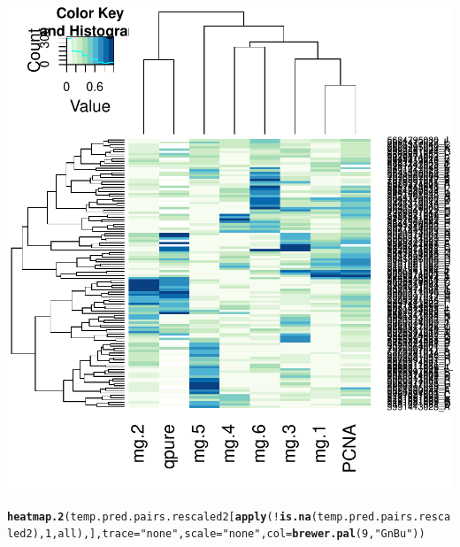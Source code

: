 \documentclass{article}\usepackage[]{graphicx}\usepackage[]{color}
\makeatletter
\def\maxwidth{ %
  \ifdim\Gin@nat@width>\linewidth
    \linewidth
  \else
    \Gin@nat@width
  \fi
}
\newcommand{\hlnum}[1]{\textcolor[rgb]{0.686,0.059,0.569}{#1}}%
\newcommand{\hlstr}[1]{\textcolor[rgb]{0.192,0.494,0.8}{#1}}%
\newcommand{\hlopt}[1]{\textcolor[rgb]{0,0,0}{#1}}%
\newcommand{\hlstd}[1]{\textcolor[rgb]{0.345,0.345,0.345}{#1}}%
\newcommand{\hlkwc}[1]{\textcolor[rgb]{0.333,0.667,0.333}{#1}}%
\newcommand{\hlkwd}[1]{\textcolor[rgb]{0.737,0.353,0.396}{\textbf{#1}}}%
\newenvironment{kframe}{%
 \def\at@end@of@kframe{}%
 \ifinner\ifhmode%
  \def\at@end@of@kframe{\end{minipage}}%
  \begin{minipage}{\columnwidth}%
 \fi\fi%
 \def\FrameCommand##1{\hskip\@totalleftmargin \hskip-\fboxsep
 \colorbox{shadecolor}{##1}\hskip-\fboxsep
     \hskip-\linewidth \hskip-\@totalleftmargin \hskip\columnwidth}%
 \MakeFramed {\advance\hsize-\width
   \@totalleftmargin\z@ \linewidth\hsize
   \@setminipage}}%
 {\par\unskip\endMakeFramed%
 \at@end@of@kframe}
\newenvironment{knitrout}{}{} %
\makeatother
\begin{document}
\begin{knitrout}
{\centering \includegraphics[width=\maxwidth]{figure/metagene-pairs-4} 

}


\begin{kframe}\begin{alltt}
\hlkwd{heatmap.2}\hlstd{(temp.pred.pairs.rescaled2[}\hlkwd{apply}\hlstd{(}\hlopt{!}\hlkwd{is.na}\hlstd{(temp.pred.pairs.rescaled2),} \hlnum{1}\hlstd{, all),],} \hlkwc{trace} \hlstd{=} \hlstr{"none"}\hlstd{,} \hlkwc{scale} \hlstd{=} \hlstr{"none"}\hlstd{,} \hlkwc{col} \hlstd{=} \hlkwd{brewer.pal}\hlstd{(}\hlnum{9}\hlstd{,} \hlstr{"GnBu"}\hlstd{))}
\end{alltt}
\end{kframe}


\end{knitrout}
\end{document}
